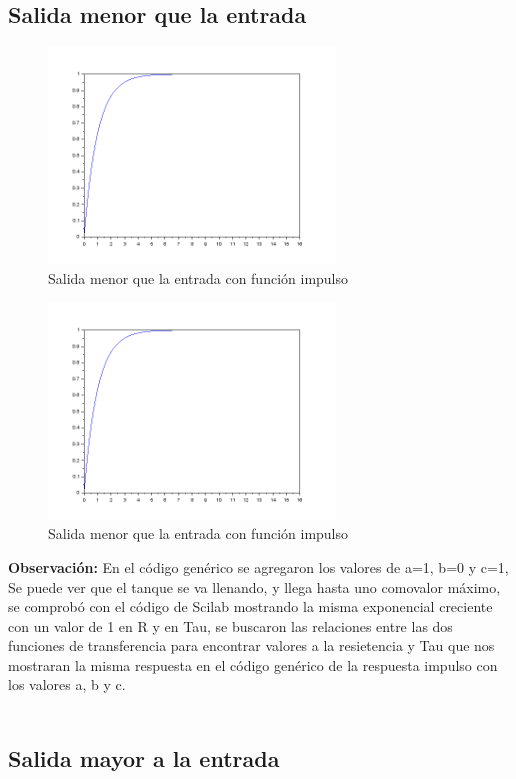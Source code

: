 \documentclass[12pt,letterpaper]{article}     %
\begin{document}
\subsection{Salida menor que la entrada}
\begin{figure}[h!]
\centering
\includegraphics[width=3in]{2}
\caption{Salida menor que la entrada con función impulso}
\end{figure}
\begin{figure}[h!]
\centering
\includegraphics[width=3in]{3}
\caption{Salida menor que la entrada con función impulso}
\end{figure}
\textbf{Observación:}
En el código genérico se agregaron los valores de a=1, b=0 y c=1,
Se puede ver que el tanque se va llenando, y llega hasta uno comovalor máximo, se comprobó con el código de Scilab mostrando la misma exponencial creciente con un valor de 1 en R y en Tau, se buscaron las relaciones entre las dos funciones de transferencia para encontrar valores a la resietencia y Tau que nos mostraran la misma respuesta en el código genérico de la respuesta impulso con los valores a, b y c.\\\\

\subsection{Salida mayor a la entrada}
\end{document}
